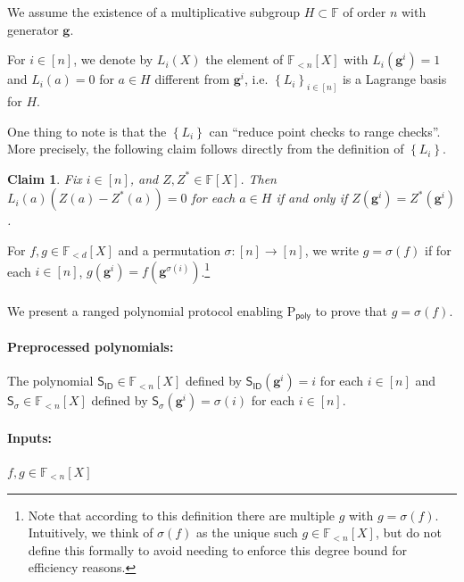 \documentclass[11pt]{article} %
\newcommand{\F}{\ensuremath{\mathbb F}\xspace}
\newcommand{\sigof}[1]{\ensuremath{\sigma(#1)}\xspace}
\newcommand{\dom}{\ensuremath{H}\xspace}
\newcommand{\sett}[2]{\ensuremath{\set{#1}_{#2}}\xspace}
\newcommand{\prvpoly}{\ensuremath{\mathrm{P_{\mathsf{poly}}}}\xspace}
\newcommand{\set}[1]{\ensuremath{\left\{#1\right\}}\xspace}
\newcommand{\hgen}{\ensuremath{\mathbf{g}}\xspace}
\newcommand{\polysofdeg}[1]{\ensuremath{\F_{< #1}[X]}\xspace}
\newcommand{\sigpoly}{\ensuremath{\mathsf{S_{\sigma}}}\xspace}
\newcommand{\idpoly}{\ensuremath{\mathsf{S_{ID}}}\xspace}
\newtheorem{claim}[lemma]{Claim}
\begin{document}
 
We assume the existence of a multiplicative subgroup $H\subset \F$ of order $n$ with generator \hgen.


For $i\in [n]$, we denote by $L_i(X)$ the element of \polysofdeg{n} with $L_i(\hgen^i)=1$ and $L_i(a)=0$ for $a\in H$ different from  $\hgen^i$, i.e. \sett{L_i}{i\in [n]} is a Lagrange basis for $H$.

One thing to note is that the \set{L_i} can ``reduce point checks to range checks''.
More precisely, the following claim follows directly from the definition of \set{L_i}.
\begin{claim}\label{clm:pointcheck}
 Fix $i\in [n]$, and $Z,Z^*\in \F[X]$. Then $L_i(a) (Z(a)-Z^*(a)) =0$ for each $a\in \dom$ if and only if 
 $Z(\hgen^i) = Z^*(\hgen^i)$.
\end{claim}




For $f,g\in \polysofdeg{d}$ and a permutation $\sigma :[n]\to [n]$,
we write $g=\sigma(f)$ if for each $i\in [n]$, $g(\hgen^i) = f(\hgen^{\sigma(i)})$.\footnote{Note that according to this definition there are multiple $g$ with $g=\sigma(f)$. Intuitively, we think of \sigof{f} as the unique such $g\in \polysofdeg{n}$, but do not define this formally to avoid needing to enforce this degree bound for efficiency reasons.}\\ \\
\noindent
We present a ranged polynomial protocol enabling \prvpoly to prove that
$g=\sigof{f}$.

\paragraph{Preprocessed polynomials:}
The polynomial $\idpoly\in \polysofdeg{n}$ defined by 
$\idpoly(\hgen^i) = i$ for each $i\in [n]$ and $\sigpoly \in \polysofdeg{n}$ defined by
$\sigpoly(\hgen^i) = \sigma(i)$ for each $i\in [n]$.
\paragraph{Inputs:}
$f,g\in \polysofdeg{n}$
\end{document}
